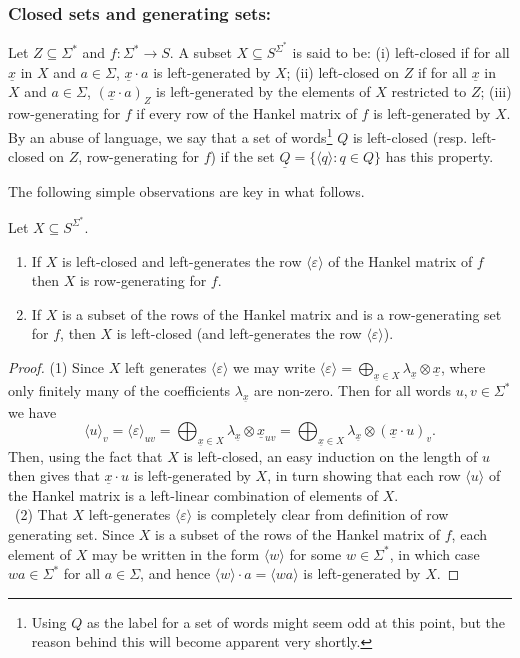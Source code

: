 \documentclass{lmcs}
\numberwithin{theorem}{section}
\begin{document}
\subsubsection*{\textbf{Closed sets and generating sets:}}
Let  $Z \subseteq \Sigma^*$ and $f: \Sigma^* \rightarrow S$. A subset $X \subseteq S^{\Sigma^*}$ is said to be: (i) left-closed if for all $\underline{x}$ in $X$ and $a \in \Sigma$, $\underline{x}\cdot a$ is left-generated by $X$; (ii) left-closed on $Z$ if for all $\underline{x}$ in $X$ and $a \in \Sigma$, $(\underline{x}\cdot a)_Z$ is left-generated by the elements of $X$ restricted to $Z$; (iii) row-generating for $f$ if every row of the Hankel matrix of $f$ is left-generated by $X$. By an abuse of language, we say that a set of words\footnote{Using $Q$ as the label for a set of words might seem odd at this point, but the reason behind this will become apparent very shortly.} $Q$ is left-closed (resp. left-closed on $Z$, row-generating for $f$) if the set $\underline{Q}=\{ \langle q \rangle: q \in Q\}$ has this property.

The following simple observations are key in what follows.
\begin{lem}
\label{lem:leftgen}
Let $X \subseteq S^{\Sigma^*}$.
\begin{enumerate}
    \item If $X$ is left-closed and left-generates the row $\langle \varepsilon \rangle$ of the Hankel matrix of $f$ then $X$ is row-generating for $f$.
    \item If $X$ is a subset of the rows of the Hankel matrix and is a row-generating set for $f$, then $X$ is left-closed (and left-generates the row $\langle \varepsilon \rangle$).
\end{enumerate}
\end{lem}
\begin{proof}
(1) Since $X$ left generates  $\langle \varepsilon \rangle$ we may write $\langle \varepsilon \rangle = \bigoplus_{\underline{x}  \in X} \lambda_{\underline{x}} \otimes \underline{x}$, where only finitely many of the coefficients $\lambda_{\underline{x}}$ are non-zero. Then for all words $u,v \in \Sigma^*$ we have $$\langle u \rangle_v = \langle \varepsilon \rangle_{uv} = \bigoplus_{\underline{x}  \in X} \lambda_{\underline{x}} \otimes \underline{x}_{uv} = \bigoplus_{\underline{x}  \in X} \lambda_{\underline{x}} \otimes (\underline{x} \cdot u)_v.$$
Then, using the fact that $X$ is left-closed, an easy induction on the length of $u$ then gives that $\underline{x}\cdot u$ is left-generated by $X$, in turn showing that each row  $\langle u \rangle$ of the Hankel matrix is a left-linear combination of elements of $X$.\\ \ 
(2) That $X$ left-generates $\langle \varepsilon \rangle$ is completely clear from definition of row generating set. Since $X$ is a subset of the rows of the Hankel matrix of $f$, each element of $X$ may be written in the form $\langle w \rangle$ for some $w \in \Sigma^*$, in which case $wa \in \Sigma^*$ for all $a \in \Sigma$, and hence $\langle w \rangle\cdot a = \langle wa \rangle$ is left-generated by $X$.
\end{proof}
\end{document}
